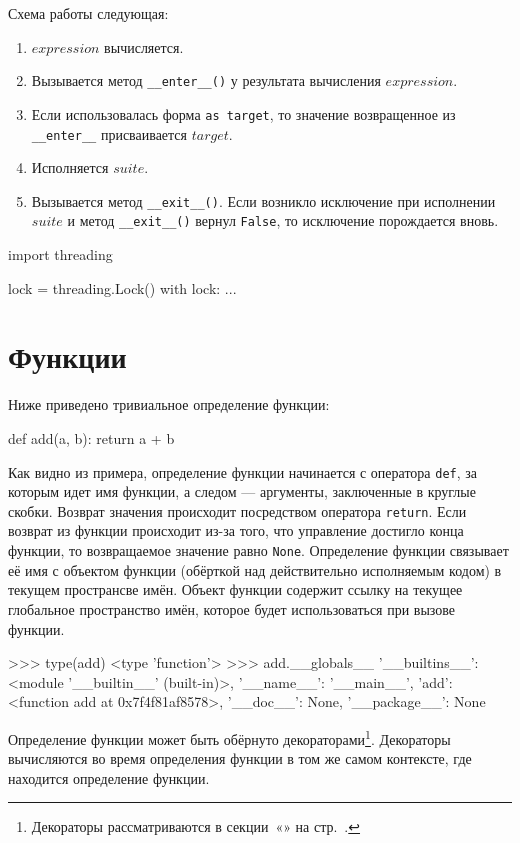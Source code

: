 Схема работы следующая:
\begin{enumerate}
  \item $expression$ вычисляется.
  \item Вызывается метод \lstinline{__enter__()} у результата вычисления $expression$.
  \item Если использовалась форма \lstinline{as target}, то значение возвращенное из \lstinline{__enter__} присваивается $target$.
  \item Исполняется $suite$.
  \item Вызывается метод \lstinline{__exit__()}. Если возникло исключение при исполнении $suite$ и метод \lstinline{__exit__()} вернул \lstinline{False}, то исключение порождается вновь.
\end{enumerate}

\begin{pylst}{}{}
import threading

lock = threading.Lock()
with lock: ...
\end{pylst}

\section{Функции}
Ниже приведено тривиальное определение функции:
\begin{pylst}{}{}
def add(a, b):
    return a + b
\end{pylst}

Как видно из примера, определение функции начинается с оператора \lstinline{def}, за которым идет имя функции, а следом — аргументы, заключенные в круглые скобки. Возврат значения происходит посредством оператора \lstinline{return}. Если возврат из функции происходит из-за того, что управление достигло конца функции, то возвращаемое значение равно \lstinline{None}. Определение функции связывает её имя с объектом функции (обёрткой над действительно исполняемым кодом) в текущем пространсве имён. Объект функции содержит ссылку на текущее глобальное пространство имён, которое будет использоваться при вызове функции.
\begin{pylst}{}{}
>>> type(add)
<type 'function'>
>>> add.__globals__
{'__builtins__': <module '__builtin__' (built-in)>,
 '__name__': '__main__', 'add': <function add at 0x7f4f81af8578>,
 '__doc__': None, '__package__': None}
\end{pylst}

Определение функции может быть обёрнуто декораторами\footnote{Декораторы рассматриваются в секции~«» на стр.~\pageref{sec:py-decorators}.}. Декораторы вычисляются во время определения функции в том же самом контексте, где находится определение функции.

